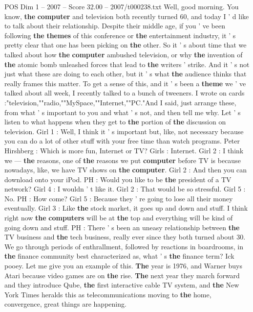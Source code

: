 \begin{textsample}{POS Dim 1 – 2007 – Score 32.00 – 2007/t000238.txt}  \label{ex:f1_pos_021}
Well, good morning.
You know, \textbf{the} \textbf{computer} and television both recently turned 60, and today I ' d like to talk about their relationship.
Despite their middle age, if you ' ve been following \textbf{the} \textbf{themes} of this conference or \textbf{the} entertainment industry, it ' s pretty clear that one has been picking on \textbf{the} other.
So it ' s about time that we talked about how \textbf{the} \textbf{computer} ambushed television, or why \textbf{the} invention of \textbf{the} atomic bomb unleashed forces that lead to \textbf{the} writers ' strike.
And it ' s not just what these are doing to each other, but it ' s what \textbf{the} audience thinks that really frames this matter.
To get a sense of this, and it ' s been a \textbf{theme} we ' ve talked about all week, I recently talked to a bunch of tweeners.
I wrote on cards :"television,""radio,""MySpace,""Internet,""PC."And I said, just arrange these, from what ' s important to you and what ' s not, and then tell me why.
Let ' s listen to what happens when they get to \textbf{the} portion of \textbf{the} discussion on television.
Girl 1 : Well, I think it ' s important but, like, not necessary because you can do a lot of other stuff with your free time than watch programs.
Peter Hirshberg : Which is more fun, Internet or TV?
Girls : Internet.
Girl 2 : I think we — \textbf{the} reasons, one of \textbf{the} reasons we put \textbf{computer} before TV is because nowadays, like, we have TV shows on \textbf{the} \textbf{computer}.
Girl 2 : And then you can download onto your iPod.
PH : Would you like to be \textbf{the} president of a TV network?
Girl 4 : I wouldn ' t like it.
Girl 2 : That would be so stressful.
Girl 5 : No.
PH : How come?
Girl 5 : Because they ' re going to lose all their money eventually.
Girl 3 : Like \textbf{the} stock market, it goes up and down and stuff.
I think right now \textbf{the} \textbf{computers} will be at \textbf{the} top and everything will be kind of going down and stuff.
PH : There ' s been an uneasy relationship between \textbf{the} TV business and \textbf{the} tech business, really ever since they both turned about 30.
We go through periods of enthrallment, followed by reactions in boardrooms, in \textbf{the} finance community best characterized as, what ' s \textbf{the} finance term?
Ick pooey.
Let me give you an example of this. \textbf{The} year is 1976, and Warner buys Atari because video games are on \textbf{the} rise. \textbf{The} next year they march forward and they introduce Qube, \textbf{the} first interactive cable TV system, and \textbf{the} New York Times heralds this as telecommunications moving to \textbf{the} home, convergence, great things are happening.

\end{textsample}
